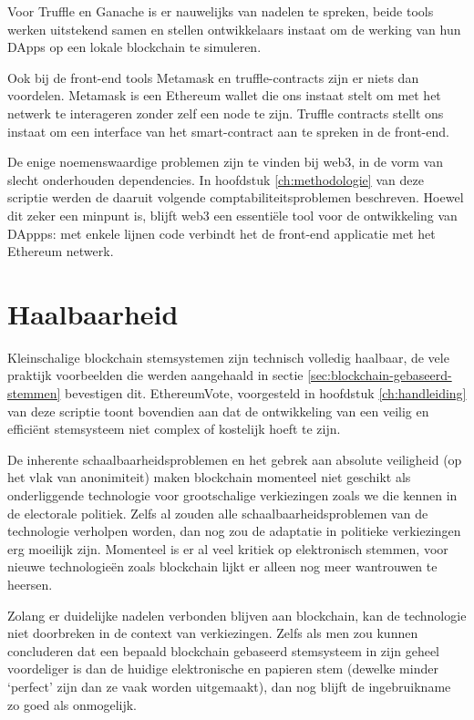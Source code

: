 Voor Truffle en Ganache is er nauwelijks van nadelen te spreken, beide tools werken uitstekend samen en stellen ontwikkelaars instaat om de werking van hun DApps op een lokale blockchain te simuleren. 

Ook bij de front-end tools Metamask en truffle-contracts zijn er niets dan voordelen. Metamask is een Ethereum wallet die ons instaat stelt om met het netwerk te interageren zonder zelf een node te zijn. Truffle contracts stellt ons instaat om een interface van het smart-contract aan te spreken in de front-end. 

De enige noemenswaardige problemen zijn te vinden bij web3, in de vorm van slecht onderhouden dependencies. In hoofdstuk \ref{ch:methodologie} van deze scriptie werden de daaruit volgende comptabiliteitsproblemen beschreven. Hoewel dit zeker een minpunt is,  blijft web3 een essentiële tool voor de ontwikkeling van DAppps: met enkele lijnen code verbindt het de front-end applicatie met het Ethereum netwerk.
\section{Haalbaarheid}
Kleinschalige blockchain stemsystemen zijn technisch volledig haalbaar, de vele praktijk voorbeelden die werden aangehaald in sectie \ref{sec:blockchain-gebaseerd-stemmen} bevestigen dit. EthereumVote, voorgesteld in hoofdstuk \ref{ch:handleiding} van deze scriptie toont bovendien aan dat de ontwikkeling van een veilig en efficiënt stemsysteem niet complex of kostelijk hoeft te zijn.
	
De inherente schaalbaarheidsproblemen en het gebrek aan absolute veiligheid (op het vlak van anonimiteit) maken blockchain momenteel niet geschikt als onderliggende technologie voor grootschalige verkiezingen zoals we die kennen in de electorale politiek. Zelfs al zouden alle schaalbaarheidsproblemen van de technologie verholpen worden, dan nog zou de adaptatie in politieke verkiezingen erg moeilijk zijn.  Momenteel is er al veel kritiek op elektronisch stemmen, voor nieuwe technologieën zoals blockchain lijkt er alleen nog meer wantrouwen te heersen. 
	
Zolang er duidelijke nadelen verbonden blijven aan blockchain, kan de technologie niet doorbreken in de context van verkiezingen.  Zelfs als men zou kunnen concluderen dat een bepaald blockchain gebaseerd stemsysteem in zijn geheel voordeliger is dan de huidige elektronische en papieren stem (dewelke minder `perfect' zijn dan ze vaak worden uitgemaakt), dan nog blijft de ingebruikname zo goed als onmogelijk.
	
